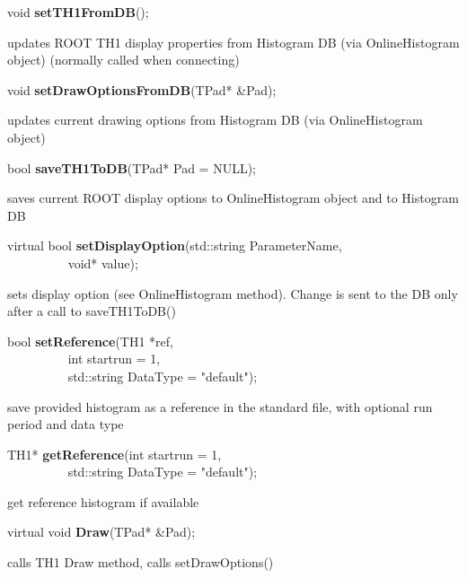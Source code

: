 \item    void {\bf setTH1FromDB}();


 updates ROOT TH1 display properties from Histogram DB (via OnlineHistogram object) 
 (normally called when connecting)


\item    void {\bf setDrawOptionsFromDB}(TPad* \&Pad);


 updates current drawing options from Histogram DB (via OnlineHistogram object)


\item    bool {\bf saveTH1ToDB}(TPad* Pad = NULL);


 saves current ROOT display options to OnlineHistogram object and to Histogram DB


\item    virtual bool {\bf setDisplayOption}(std::string ParameterName,\\\mbox{}~~~~~~~~~ 
				void* value);

 sets display option (see OnlineHistogram method). Change is sent to the DB only 
 after a call to saveTH1ToDB()


\item    bool {\bf setReference}(TH1 *ref,\\\mbox{}~~~~~~~~~
		    int startrun = 1,\\\mbox{}~~~~~~~~~
		    std::string DataType = "default");

 save provided histogram as a reference in the standard file, with optional run period and data type


\item    TH1* {\bf getReference}(int startrun = 1,\\\mbox{}~~~~~~~~~
		    std::string DataType = "default");

 get reference histogram if available


\item    virtual void {\bf Draw}(TPad* \&Pad);


 calls TH1 Draw method, calls setDrawOptions()


